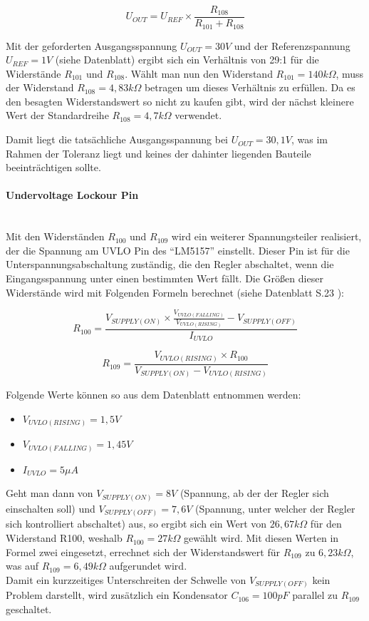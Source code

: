 \[U_{OUT} = U_{REF} \times \frac{R_{108}}{R_{101} + R_{108}}\]

Mit der geforderten Ausgangsspannung \(U_{OUT} = 30V\) und der Referenzspannung \\
\(U_{REF} = 1V\) (siehe Datenblatt) ergibt sich ein Verhältnis von 29:1 für die Widerstände \(R_{101}\) und \(R_{108}\).
Wählt man nun den Widerstand \(R_{101} = 140k\Omega\), muss der Widerstand \(R_{108} = 4,83k\Omega\) betragen um 
dieses Verhältnis zu erfüllen. Da es den besagten Widerstandswert so nicht zu kaufen gibt, wird der nächst kleinere 
Wert der Standardreihe \(R_{108} = 4,7k\Omega\) verwendet.

Damit liegt die tatsächliche Ausgangsspannung bei \(U_{OUT} = 30,1V\), was im Rahmen der Toleranz liegt und keines der dahinter
liegenden Bauteile beeinträchtigen sollte.

\paragraph{Undervoltage Lockour Pin}\mbox{}\\
Mit den Widerständen \(R_{100}\) und \(R_{109}\) wird ein weiterer Spannungsteiler realisiert, der die Spannung am
UVLO Pin des \enquote{LM5157} einstellt. Dieser Pin ist für die Unterspannungsabschaltung zuständig, die den Regler
abschaltet, wenn die Eingangsspannung unter einen bestimmten Wert fällt. Die Größen dieser Widerstände wird mit Folgenden
Formeln berechnet (siehe Datenblatt S.23 \cite{LM5157}):

\[\displaystyle
    R_{100} = \frac{V_{SUPPLY(ON)} \times
        \frac{V_{UVLO(FALLING)}}{V_{UVLO(RISING)}}
        - V_{SUPPLY(OFF)}}{I_{UVLO}}
\]

\[\displaystyle
    R_{109} = \frac{V_{UVLO(RISING)} \times R_{100}}{V_{SUPPLY(ON)} - V_{UVLO(RISING)}}
\]

Folgende Werte können so aus dem Datenblatt entnommen werden:
\begin{itemize}
    \item \(V_{UVLO(RISING)} = 1,5V\)
    \item \(V_{UVLO(FALLING)} = 1,45V\)
    \item \(I_{UVLO} = 5\mu A\)
\end{itemize}
Geht man dann von \(V_{SUPPLY(ON)} = 8V\) (Spannung, ab der der Regler sich einschalten soll) und \(V_{SUPPLY(OFF)} = 7,6V\)
(Spannung, unter welcher der Regler sich kontrolliert abschaltet) aus, so ergibt sich ein Wert von \(26,67k\Omega\) für den 
Widerstand R100, weshalb \(R_{100} = 27k\Omega\) gewählt wird. Mit diesen Werten in Formel zwei eingesetzt, errechnet sich
der Widerstandswert für \(R_{109}\) zu \(6,23k\Omega\), was auf \(R_{109} = 6,49k\Omega\) aufgerundet wird. \\
Damit ein kurzzeitiges Unterschreiten der Schwelle von \(V_{SUPPLY(OFF)}\) kein Problem darstellt, wird zusätzlich ein Kondensator
\(C_{106} = 100pF\) parallel zu \(R_{109}\) geschaltet.


